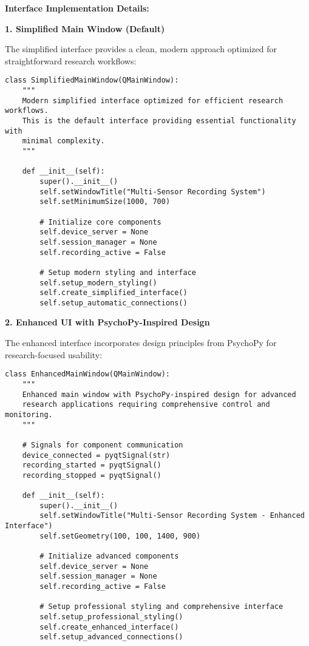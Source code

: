 \documentclass[11pt,a4paper]{article}
\begin{document}
\textbf{Interface Implementation Details:}

\textbf{1. Simplified Main Window (Default)}

The simplified interface provides a clean, modern approach optimized for straightforward research workflows:

\begin{verbatim}
class SimplifiedMainWindow(QMainWindow):
    """
    Modern simplified interface optimized for efficient research workflows.
    This is the default interface providing essential functionality with
    minimal complexity.
    """

    def __init__(self):
        super().__init__()
        self.setWindowTitle("Multi-Sensor Recording System")
        self.setMinimumSize(1000, 700)

        # Initialize core components
        self.device_server = None
        self.session_manager = None
        self.recording_active = False

        # Setup modern styling and interface
        self.setup_modern_styling()
        self.create_simplified_interface()
        self.setup_automatic_connections()
\end{verbatim}

\textbf{2. Enhanced UI with PsychoPy-Inspired Design}

The enhanced interface incorporates design principles from PsychoPy for research-focused usability:

\begin{verbatim}
class EnhancedMainWindow(QMainWindow):
    """
    Enhanced main window with PsychoPy-inspired design for advanced
    research applications requiring comprehensive control and monitoring.
    """

    # Signals for component communication
    device_connected = pyqtSignal(str)
    recording_started = pyqtSignal()
    recording_stopped = pyqtSignal()

    def __init__(self):
        super().__init__()
        self.setWindowTitle("Multi-Sensor Recording System - Enhanced Interface")
        self.setGeometry(100, 100, 1400, 900)

        # Initialize advanced components
        self.device_server = None
        self.session_manager = None
        self.recording_active = False

        # Setup professional styling and comprehensive interface
        self.setup_professional_styling()
        self.create_enhanced_interface()
        self.setup_advanced_connections()
\end{verbatim}
\end{document}
